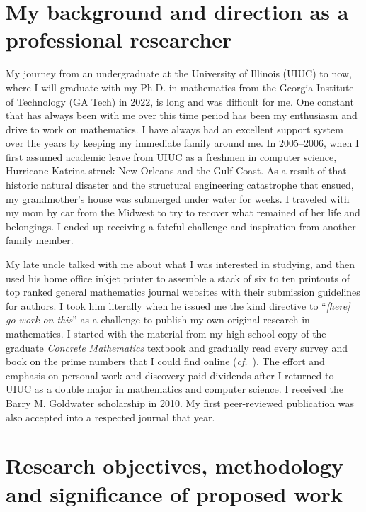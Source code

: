 \documentclass[10pt,reqno,letterpaper]{article}
\theoremstyle{plain}
\numberwithin{theorem}{section}
\theoremstyle{definition}
\newcommand{\cf}[0]{\emph{cf.}\ }
\begin{document}
\newcommand{\GRFPEssayTitle}{NSF Postdoctoral Fellowship Project Description}

\section{My background and direction as a professional researcher}

My journey from an undergraduate at the University of Illinois (UIUC) to now, 
where I will graduate with my Ph.D. in mathematics from the 
Georgia Institute of Technology (GA Tech) in 2022, 
is long and was difficult for me. 
One constant that has always been with me over this time period has been my 
enthusiasm and drive to work on mathematics. 
I have always had an excellent support system over the years 
by keeping my immediate family around me. 
In 2005--2006, when I first assumed academic leave from UIUC as a freshmen in computer science, 
Hurricane Katrina struck New Orleans and the Gulf Coast. 
As a result of that historic natural disaster and the 
structural engineering catastrophe that ensued, my grandmother's house 
was submerged under water for weeks. I traveled with my mom by car from the Midwest to try to 
recover what remained of her life and belongings. I ended up 
receiving a fateful challenge and inspiration from another family member. 

My late uncle talked with me about what I was interested in studying, and then used 
his home office inkjet printer to assemble a stack of six to ten printouts of top ranked general 
mathematics journal websites with their submission guidelines for authors. 
I took him literally when he issued me the kind directive to ``\emph{[here] go work on this}'' as a challenge 
to publish my own original research in mathematics. 
I started with the material from my high school copy of the graduate 
\emph{Concrete Mathematics} textbook \cite{GKP} and gradually 
read every survey and book on the prime numbers that I could find online 
(\cf \cite{PRIMEREC}). 
The effort and emphasis on personal work and 
discovery paid dividends after I returned 
to UIUC as a double major in mathematics and computer science. 
I received the Barry M. Goldwater scholarship in 2010. 
My first peer-reviewed publication was also accepted into a respected journal that year. 

\section{Research objectives, methodology and significance of proposed work} 
\label{Section_SummaryOfPriorWork} 
\end{document}
